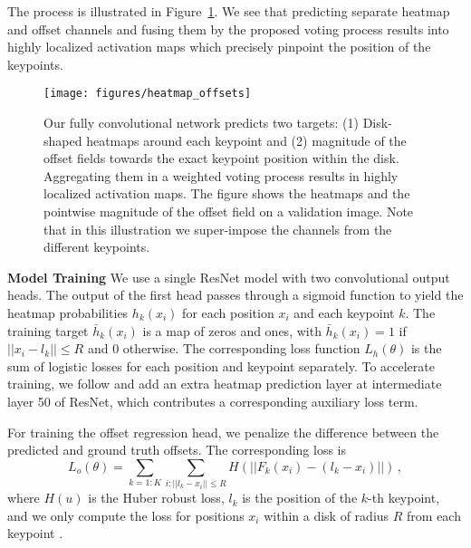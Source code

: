 \documentclass[10pt,twocolumn,letterpaper]{article}
\newcommand{\calA}{\mathcal{A}}
\newcommand{\calI}{\mathcal{I}}
\newcommand{\calX}{\mathcal{X}}
\newcommand{\eat}[1]{}
\begin{document}
The process is illustrated in Figure~\ref{fig:heatmap_offsets}. We see that predicting separate heatmap and offset channels and fusing them by the proposed voting process results into highly localized activation maps which precisely pinpoint the position of the keypoints.

\begin{figure}
\centering
\texttt{[image: figures/heatmap\_offsets]}
\caption{\label{fig:heatmap_offsets}
Our fully convolutional network predicts two targets: (1) Disk-shaped heatmaps around each keypoint and (2) magnitude of the offset fields towards the exact keypoint position within the disk. Aggregating them in a weighted voting process results in highly localized activation maps. The figure shows the heatmaps and the pointwise magnitude of the offset field on a validation image. Note that in this illustration we super-impose the channels from the different keypoints.
}
\end{figure}

\textbf{Model Training}
We use a single ResNet model with two convolutional output heads. The output of the first head passes through a sigmoid function to yield the heatmap probabilities $h_k(x_i)$ for each position $x_i$ and each keypoint $k$. The training target $\bar{h}_k(x_i)$ is a map of zeros and ones, with $\bar{h}_k(x_i) = 1$ if $||x_i - l_k|| \le R$ and 0 otherwise. The corresponding loss function $L_h(\theta)$ is the sum of logistic losses for each position and keypoint separately.
To accelerate training, we follow \cite{deeper_cut} and add an extra heatmap prediction layer at  intermediate layer 50 of ResNet, which contributes a corresponding auxiliary loss term.

\eat{
To train the heatmap head, we use the following per-anchor cross entropy loss function:
\[
L^k_h(y^k, \calI, \theta) = - \sum_{a \in \calA}
  t_a^k \log p(h_a^k = 1 | \calI, \theta)
  \]
where $y^k \in \calX$ is the true location of keypoint $k$,
and $t_a^k  = \delta_r(y^k, a)$ encodes the true location
using a heatmap with a disk of radius $r$
centered on the true location.
If the keypoint is not visible, then $t_a^k=0$ for all locations $a$,
so the model will be encouraged not to hallucinate invisible joints.
(In some settings, we might want the model to perform amodal completion,
but that is beyond the scope of this paper.)
}

For training the offset regression head, we penalize the difference between the predicted and ground truth offsets. The corresponding loss is
\begin{equation}
L_o(\theta) = \sum_{k=1:K} \sum_{i : ||l_k - x_i|| \le R} H(||F_k(x_i) - (l_k - x_i)||) \,,
\end{equation}
where $H(u)$ is the Huber robust loss, $l_k$ is the position of the $k$-th keypoint, and we only compute the loss for positions $x_i$ within a disk of radius $R$ from each keypoint \cite{Ren2015}.
\end{document}
